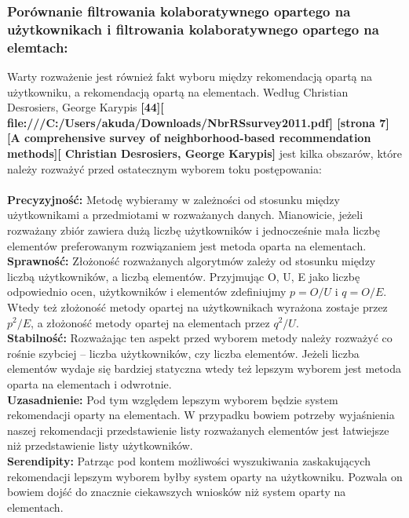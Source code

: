 \documentclass[12pt,a4paper]{report}
\begin{document}
\subsubsection{Porównanie filtrowania kolaboratywnego opartego na użytkownikach i filtrowania kolaboratywnego opartego na elemtach:}
Warty rozważenie jest również fakt wyboru między rekomendacją opartą na użytkowniku, a rekomendacją opartą na elementach. Według Christian Desrosiers, George Karypis \textbf{[44][ file:///C:/Users/akuda/Downloads/NbrRSsurvey2011.pdf] [strona 7] [A comprehensive survey of neighborhood-based recommendation methods][ Christian Desrosiers, George Karypis]} jest kilka obszarów, które należy rozważyć przed ostatecznym wyborem toku postępowania:
\\
\\
\textbf{Precyzyjność:} Metodę wybieramy w zależności od stosunku między użytkownikami a przedmiotami w rozważanych danych. Mianowicie, jeżeli rozważany zbiór zawiera dużą liczbę użytkowników i jednocześnie mała liczbę elementów preferowanym rozwiązaniem jest metoda oparta na elementach.
\\
\textbf{Sprawność:} Złożoność rozważanych algorytmów zależy od stosunku między liczbą użytkowników, a liczbą elementów. Przyjmując O, U, E jako liczbę odpowiednio ocen, użytkowników i elementów zdefiniujmy 
$p = O/U$ i $q = O/E$. Wtedy też złożoność metody opartej na użytkownikach wyrażona zostaje przez $p^2/E$, a złożoność metody opartej na elementach przez $q^2/U$.
\\
\textbf{Stabilność:} Rozważając ten aspekt przed wyborem metody należy rozważyć co rośnie szybciej – liczba użytkowników, czy liczba elementów. Jeżeli liczba elementów wydaje się bardziej statyczna wtedy też lepszym wyborem jest metoda oparta na elementach i odwrotnie.
\\
\textbf{Uzasadnienie:} Pod tym względem lepszym wyborem będzie system rekomendacji oparty na elementach. W przypadku bowiem potrzeby wyjaśnienia naszej rekomendacji przedstawienie listy rozważanych elementów jest łatwiejsze niż przedstawienie listy użytkowników.
\\
\textbf{Serendipity:} Patrząc pod kontem możliwości wyszukiwania zaskakujących rekomendacji lepszym wyborem byłby system oparty na użytkowniku. Pozwala on bowiem dojść do znacznie ciekawszych wniosków niż system oparty na elementach.
\\
\end{document}
